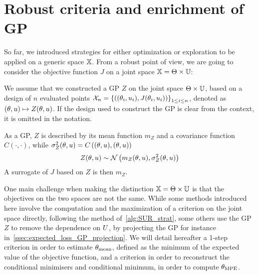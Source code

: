 \documentclass[../../Main_ManuscritThese.tex]{subfiles}
\begin{document}
\section{Robust criteria and enrichment of GP}
\label{sec:robust_criteria_gp}
So far, we introduced strategies for either optimization or exploration to be applied on a generic space $\mathbb{X}$. From a robust point of view, we are going to consider the objective function $J$ on a joint space $\mathbb{X} = \Theta \times \mathbb{U}$:

We assume that we constructed a GP $Z$ on the joint space $\Theta \times \mathbb{U}$, based on a design of $n$ evaluated points $\mathcal{X}_n = \left\{\left((\theta_i,u_i),J(\theta_i, u_i) \right)\right\}_{1\leq i \leq n}$, denoted as $(\theta,u)\mapsto Z(\theta,u)$. If the design used to construct the GP is clear from the context, it is omitted in the notation.

As a GP, $Z$ is described by its mean function $m_{Z}$ and a covariance function $C(\cdot, \cdot)$, while $\sigma^2_Z(\theta,u) = C\left((\theta,u), (\theta,u)\right)$
\begin{equation}
  Z(\theta,u) \sim \mathcal{N}\left(m_{Z}(\theta,u), \sigma^2_Z(\theta,u) \right)
\end{equation}
A surrogate of $J$ based on $Z$ is then $m_Z$.

One main challenge when making the distinction $\mathbb{X} = \Theta \times \mathbb{U}$ is that the objectives on the two spaces are not the same.
While some methods introduced here involve the computation and the maximization of a criterion on the joint space directly, following the method of~\cref{alg:SUR_strat},
some others use the GP $Z$ to remove the dependence on $U$, by projecting the GP for instance in~\cref{ssec:expected_loss_GP_projection}.
We will detail hereafter a 1-step criterion in order to estimate ${\theta}_{\mathrm{mean}}$, defined as the minimum of the expected value of the objective function, and a criterion in order to reconstruct the conditional minimisers and conditional minimum, in order to compute ${\theta}_{\mathrm{MPE}}$.
\end{document}

